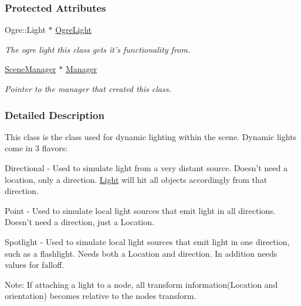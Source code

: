 \subsubsection*{Protected Attributes}
\begin{DoxyCompactItemize}
\item 
\hypertarget{classphys_1_1Light_a20fc9136847907955cfb8c1a47d6ec6a}{
Ogre::Light $\ast$ \hyperlink{classphys_1_1Light_a20fc9136847907955cfb8c1a47d6ec6a}{OgreLight}}
\label{dc/df1/classphys_1_1Light_a20fc9136847907955cfb8c1a47d6ec6a}

\begin{DoxyCompactList}\small\item\em The ogre light this class gets it's functionality from. \item\end{DoxyCompactList}\item 
\hypertarget{classphys_1_1Light_a2633fc1795d2a3e2ddddc71674a7eb84}{
\hyperlink{classphys_1_1SceneManager}{SceneManager} $\ast$ \hyperlink{classphys_1_1Light_a2633fc1795d2a3e2ddddc71674a7eb84}{Manager}}
\label{dc/df1/classphys_1_1Light_a2633fc1795d2a3e2ddddc71674a7eb84}

\begin{DoxyCompactList}\small\item\em Pointer to the manager that created this class. \item\end{DoxyCompactList}\end{DoxyCompactItemize}


\subsubsection{Detailed Description}
This class is the class used for dynamic lighting within the scene. Dynamic lights come in 3 flavors: \par
 Directional -\/ Used to simulate light from a very distant source. Doesn't need a location, only a direction. \hyperlink{classphys_1_1Light}{Light} will hit all objects accordingly from that direction. \par
 Point -\/ Used to simulate local light sources that emit light in all directions. Doesn't need a direction, just a Location. \par
 Spotlight -\/ Used to simulate local light sources that emit light in one direction, such as a flashlight. Needs both a Location and direction. In addition needs values for falloff. \par
 Note: If attaching a light to a node, all transform information(Location and orientation) becomes relative to the nodes transform. 

